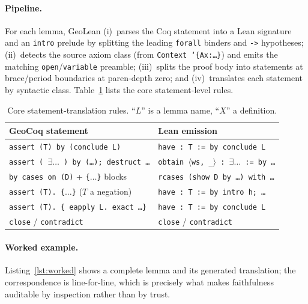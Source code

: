 \documentclass{article}
\begin{document}
\paragraph{Pipeline.}
For each lemma, GeoLean (i)~parses the Coq statement into a Lean signature and an
\texttt{intro} prelude by splitting the leading \texttt{forall} binders and \texttt{->}
hypotheses; (ii)~detects the source axiom class (from \texttt{Context `\{Ax:\ldots\}}) and emits
the matching \texttt{open}/\texttt{variable} preamble; (iii)~splits the proof body into statements
at brace/period boundaries at paren-depth zero; and (iv)~translates each statement by syntactic
class. Table~\ref{tab:rules} lists the core statement-level rules.

\begin{table}[t]
  \centering
  \caption{Core statement-translation rules. ``$L$'' is a lemma name, ``$X$'' a definition.}
  \label{tab:rules}
  \small
  \begin{tabular}{ll}
    \toprule
    GeoCoq statement & Lean emission \\
    \midrule
    \texttt{assert (T) by (conclude L)} & \texttt{have : T := by conclude L} \\
    \texttt{assert (\,$\exists\ldots$\,) by (\ldots); destruct \ldots} & \texttt{obtain $\langle$ws, \_$\rangle$ : $\exists\ldots$ := by \ldots} \\
    \texttt{by cases on (D)} + \texttt{\{$\ldots$\}} blocks & \texttt{rcases (show D by \ldots) with \ldots} \\
    \texttt{assert (T). \{$\ldots$\}} ($T$ a negation) & \texttt{have : T := by intro h; \ldots} \\
    \texttt{assert (T). \{ eapply L. exact \ldots \}} & \texttt{have : T := by conclude L} \\
    \texttt{close} / \texttt{contradict} & \texttt{close} / \texttt{contradict} \\
    \bottomrule
  \end{tabular}
\end{table}

\paragraph{Worked example.}
Listing~\ref{lst:worked} shows a complete lemma and its generated translation; the
correspondence is line-for-line, which is precisely what makes faithfulness auditable by
inspection rather than by trust.
\end{document}
